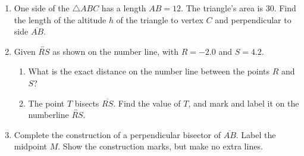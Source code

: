 \documentclass[12pt, twoside]{article}
\begin{document}
\begin{enumerate}
\newpage

  \item One side of the $\triangle ABC$ has a length $AB=12$. The triangle's area is 30. Find the length of the altitude $h$ of the triangle to vertex $C$ and perpendicular to side $\overline{AB}$.\\[0.5cm]
   \vspace{1.0cm}


  \item Given $\overleftrightarrow{RS}$ as shown on the number line, with $R=-2.0$ and $S=4.2$. \\[20pt] %
  \begin{enumerate}
    \item What is the exact distance on the number line between the points $R$ and $S$? \vspace{3cm} 
    \item The point $T$ bisects $\overline{RS}$. Find the value of $T$, and mark and label it on the numberline $\overleftrightarrow{RS}$. 
  \end{enumerate} \vspace{3cm}  
  
\newpage

  \item Complete the construction of a perpendicular bisector of $\overline{AB}$. Label the midpoint $M$. Show the construction marks, but make no extra lines. \vspace{2cm}
  \begin{center}
  \end{center} \vspace{4cm}


\end{enumerate}
\end{document}
